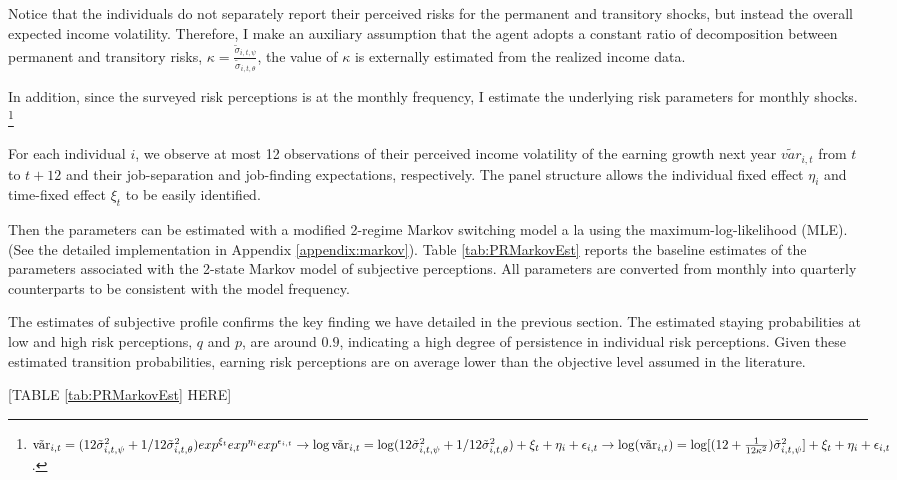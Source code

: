 Notice that the individuals do not separately report their perceived risks for the permanent and transitory shocks, but instead the overall expected income volatility. Therefore, I make an auxiliary assumption that the agent adopts a constant ratio of decomposition between permanent and transitory risks, $\kappa =\frac{\tilde \sigma_{i,t,\psi}}{\tilde \sigma_{i,t,\theta}}$, the value of $\kappa$ is externally estimated from the realized income data. 

In addition, since the surveyed risk perceptions is at the monthly frequency, I estimate the underlying risk parameters for monthly shocks. \footnote{
$\tilde {\text{var}}_{i,t}= (12 \tilde \sigma^2_{i,t,\psi} + 1/12 \tilde \sigma^2_{i,t,\theta})exp^{\xi_{t}}exp^{\eta_{i}}exp^{\epsilon_{i,t}} \rightarrow
\log \tilde {\text{var}}_{i,t}= \log (12 \tilde \sigma^2_{i,t,\psi} + 1/12 \tilde \sigma^2_{i,t,\theta})+\xi_{t}+\eta_{i}+\epsilon_{i,t} \rightarrow
\log(\tilde {\text{var}}_{i,t})= \log [(12+\frac{1}{12\kappa^2})\tilde \sigma^2_{i,t,\psi}] + \xi_{t}+\eta_{i}+ \epsilon_{i,t}$.}

For each individual $i$, we observe at most 12 observations of their perceived income volatility of the earning growth next year $\tilde {var}_{i,t}$ from $t$ to $t+12$ and their job-separation and job-finding expectations, respectively. The panel structure allows the individual fixed effect $\eta_i$ and time-fixed effect $\xi_t$ to be easily identified.  

Then the parameters can be estimated with a modified 2-regime Markov switching model a la \cite{hamilton1989new} using the maximum-log-likelihood (MLE). (See the detailed implementation in Appendix \ref{appendix:markov}). Table \ref{tab:PRMarkovEst}  reports the baseline estimates of the parameters associated with the 2-state Markov model of subjective perceptions. All parameters are converted from monthly into quarterly counterparts to be consistent with the model frequency. 

The estimates of subjective profile confirms the key finding we have detailed in the previous section. The estimated staying probabilities at low and high risk perceptions, $q$ and $p$, are around $0.9$, indicating a high degree of persistence in individual risk perceptions. Given these estimated transition probabilities, earning risk perceptions are on average lower than the objective level assumed in the literature.  


\begin{center}
[TABLE \ref{tab:PRMarkovEst} HERE]
\end{center}


